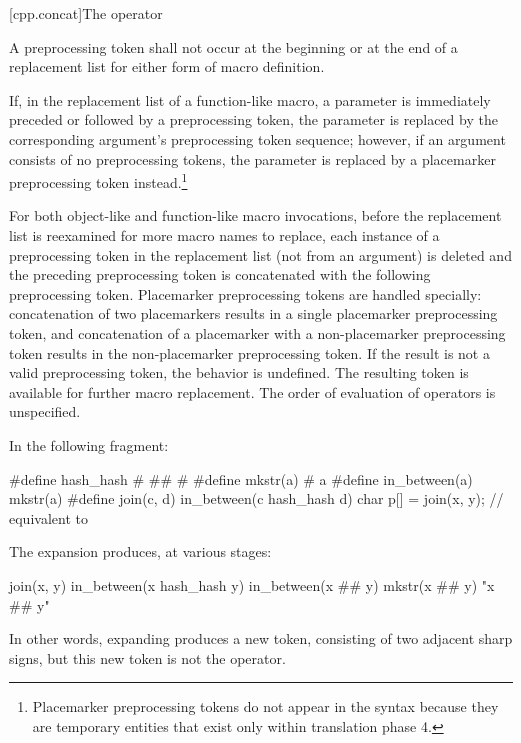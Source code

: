 [cpp.concat]{The \tcode{\#\#} operator}%
%

\pnum
A
\tcode{\#\#}
preprocessing token shall not occur at the beginning or
at the end of a replacement list for either form
of macro definition.

\pnum
If, in the replacement list of a function-like macro, a parameter is
immediately preceded or followed by a
\tcode{\#\#}
preprocessing token, the parameter is replaced by the
corresponding argument's preprocessing token sequence; however, if an argument consists of no preprocessing tokens, the parameter is
replaced by a placemarker preprocessing token instead.\footnote{Placemarker preprocessing tokens do not appear in the syntax
because they are temporary entities that exist only within translation phase 4.}

\pnum
For both object-like and function-like macro invocations, before the
replacement list is reexamined for more macro names to replace,
each instance of a
\tcode{\#\#}
preprocessing token in the replacement list
(not from an argument) is deleted and the
preceding preprocessing token is concatenated
with the following preprocessing token.
Placemarker preprocessing tokens are handled specially: concatenation
of two placemarkers results in a single placemarker preprocessing token, and
concatenation of a placemarker with a non-placemarker preprocessing token results
in the non-placemarker preprocessing token.
If the result is not a valid preprocessing token,
the behavior is undefined.
The resulting token is available for further macro replacement.
The order of evaluation of
\tcode{\#\#}
operators is unspecified.

\begin{example} In the following fragment:

\begin{codeblock}
#define hash_hash # ## #
#define mkstr(a) # a
#define in_between(a) mkstr(a)
#define join(c, d) in_between(c hash_hash d)
char p[] = join(x, y);          // equivalent to 
\end{codeblock}

The expansion produces, at various stages:

\begin{codeblock}
join(x, y)
in_between(x hash_hash y)
in_between(x ## y)
mkstr(x ## y)
"x ## y"
\end{codeblock}

In other words, expanding  produces a new token,
consisting of two adjacent sharp signs, but this new token is not the
\tcode{\#\#} operator. \end{example}

